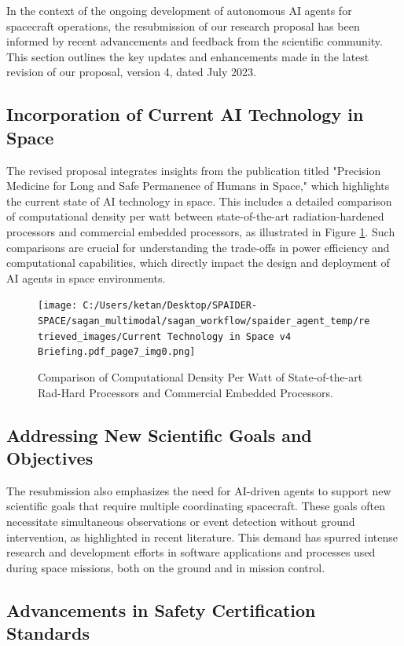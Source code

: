 \documentclass[a4paper, 11pt]{article}
\begin{document}
In the context of the ongoing development of autonomous AI agents for spacecraft operations, the resubmission of our research proposal has been informed by recent advancements and feedback from the scientific community. This section outlines the key updates and enhancements made in the latest revision of our proposal, version 4, dated July 2023.

\subsection{Incorporation of Current AI Technology in Space}

The revised proposal integrates insights from the publication titled "Precision Medicine for Long and Safe Permanence of Humans in Space," which highlights the current state of AI technology in space. This includes a detailed comparison of computational density per watt between state-of-the-art radiation-hardened processors and commercial embedded processors, as illustrated in Figure \ref{fig:comp-density}. Such comparisons are crucial for understanding the trade-offs in power efficiency and computational capabilities, which directly impact the design and deployment of AI agents in space environments.

\begin{figure}[htbp]
    \centering
    \texttt{[image: C:/Users/ketan/Desktop/SPAIDER-SPACE/sagan\_multimodal/sagan\_workflow/spaider\_agent\_temp/retrieved\_images/Current Technology in Space v4 Briefing.pdf\_page7\_img0.png]}
    \caption{Comparison of Computational Density Per Watt of State-of-the-art Rad-Hard Processors and Commercial Embedded Processors.}
    \label{fig:comp-density}
\end{figure}

\subsection{Addressing New Scientific Goals and Objectives}

The resubmission also emphasizes the need for AI-driven agents to support new scientific goals that require multiple coordinating spacecraft. These goals often necessitate simultaneous observations or event detection without ground intervention, as highlighted in recent literature. This demand has spurred intense research and development efforts in software applications and processes used during space missions, both on the ground and in mission control.

\subsection{Advancements in Safety Certification Standards}
\end{document}
